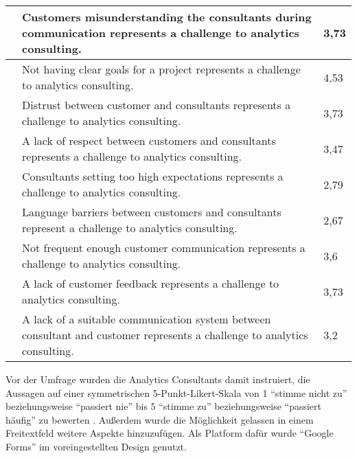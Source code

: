 \documentclass[../main.tex]{subfiles}
\begin{document}
\begin{dontcount}
\begin{xltabular}[h]{\linewidth}{| N X | m{2.2cm}|}
        \hline
        \label{q:7}&\hspace{-0.8em}Customers misunderstanding the consultants during communication represents a challenge to analytics consulting. & 3,73  \\
        \hline
        \label{q:8}&\hspace{-0.8em}Not having clear goals for a project represents a challenge to analytics consulting. & 4,53  \\
        \hline
        \label{q:9}&\hspace{-0.8em}Distrust between customer and consultants represents a challenge to analytics consulting. & 3,73  \\
        \hline
        \label{q:10}&\hspace{-0.8em}A lack of respect between customers and consultants represents a challenge to analytics consulting. & 3,47  \\
        \hline
        \label{q:11}&\hspace{-0.8em}Consultants setting too high expectations represents a challenge to analytics consulting. & 2,79  \\
        \hline
        \label{q:12}&\hspace{-0.8em}Language barriers between customers and consultants represent a challenge to analytics consulting. & 2,67  \\
        \hline
        \label{q:13}&\hspace{-0.8em}Not frequent enough customer communication represents a challenge to analytics consulting. & 3,6  \\
        \hline
        \label{q:14}&\hspace{-0.8em}A lack of customer feedback represents a challenge to analytics consulting. & 3,73  \\
        \hline
        \label{q:15}&\hspace{-0.8em}A lack of a suitable communication system between consultant and customer represents a challenge to analytics consulting. & 3,2  \\
        \hline
    \end{xltabular}
\end{dontcount}

Vor der Umfrage wurden die Analytics Consultants damit instruiert, die Aussagen auf einer symmetrischen 5-Punkt-Likert-Skala von 1 ``stimme nicht zu'' beziehungsweise ``passiert nie'' bis 5 ``stimme zu'' beziehungsweise ``passiert häufig'' zu bewerten \autocite{joshi2015likert}.
Außerdem wurde die Möglichkeit gelassen in einem Freitextfeld weitere Aspekte hinzuzufügen.
Als Platform dafür wurde \enquote{Google Forms} im voreingestellten Design genutzt.
\end{document}
